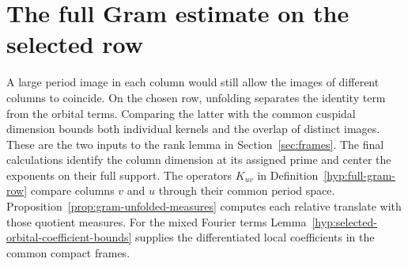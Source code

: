 \section{The full Gram estimate on the selected row}
\label{sec:selected-row-gram}

A large period image in each column would still allow the images of different columns to coincide. On the chosen row, unfolding separates the identity term from the orbital terms. Comparing the latter with the common cuspidal dimension bounds both individual kernels and the overlap of distinct images. These are the two inputs
to the rank lemma in Section~\ref{sec:frames}. The final
calculations identify the column dimension at its assigned
prime and center the exponents on their full support. The operators \(K_{uv}\) in Definition~\ref{hyp:full-gram-row} compare columns \(v\) and \(u\) through their common period space. Proposition~\ref{prop:gram-unfolded-measures} computes each relative translate with those quotient measures. For the mixed Fourier terms Lemma~\ref{hyp:selected-orbital-coefficient-bounds} supplies the differentiated local coefficients in the common compact frames.

